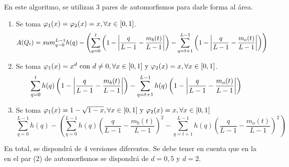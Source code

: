 En este algoritmo, se utilizan 3 pares de automorfismos para darle forma al área. 




\begin{enumerate}\label{enum:funcionesalg2}
    \item Se toma $\varphi_1(x) = \varphi_2(x) = x, \forall x\in[0,1]$.
    $$A(Q_t) = sum_{q=0}^{L-1} h(q) - \left(\sum_{q=0}^{t} \left(1-\left\vert\frac{q}{L-1}-\frac{m_b(t)}{L-1}\right\vert\right) - \sum_{q=t+1}^{L-1} \left(1-\left\vert\frac{q}{L-1}-\frac{m_o(t)}{L-1}\right\vert\right)\right)$$
    \item Se toma $\varphi_1(x) = x^d \text{ con } d\neq0, \forall x\in[0,1] \text{ y } \varphi_2(x)=x, \forall x\in[0,1]$.
    $$\sum_{q=0}^{t} h(q) \left(1-\left\vert\frac{q}{L-1}-\frac{m_b(t)}{L-1}\right\vert\right) - \sum_{q=t+1}^{L-1} h(q) \left(1-\left\vert\frac{q}{L-1}-\frac{m_o(t)}{L-1}\right\vert\right)$$
    \item Se toma $\varphi_1(x) = 1-\sqrt{1-x}, \forall x\in[0,1] \text{ y } \varphi_2(x)=x,\forall x\in[0,1]$
    $$\sum_{q=0}^{L-1} h(q) - \left(\sum_{q=0}^{L-1} h(q) \left(\frac{q}{L-1}-\frac{m_b(t)}{L-1}\right)^2 - \sum_{q=t+1}^{L-1} h(q) \left(\frac{q}{L-1}-\frac{m_o(t)}{L-1}\right)^2\right)$$
\end{enumerate}
En total, se dispondrá de 4 versiones diferentes. Se debe tener en cuenta que en la en el par (2) de automorfismos se dispondrá de $d=0,5$ y $d=2$.

